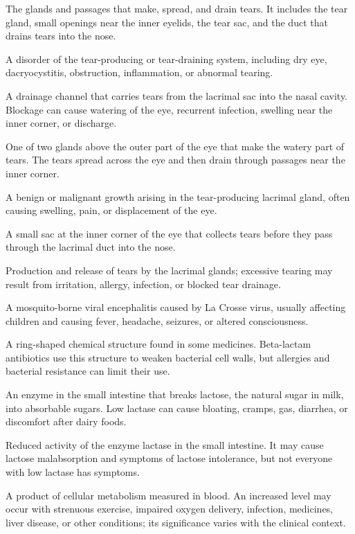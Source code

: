  The glands and passages that make, spread, and drain tears. It includes the tear gland, small openings near the inner eyelids, the tear sac, and the duct that drains tears into the nose.

 A disorder of the tear-producing or tear-draining system, including dry eye, dacryocystitis, obstruction, inflammation, or abnormal tearing.

 A drainage channel that carries tears from the lacrimal sac into the nasal cavity. Blockage can cause
watering of the eye, recurrent infection, swelling near the inner corner, or discharge.

 One of two glands above the outer part of the eye that make the watery part of tears. The tears spread across the eye and then drain through passages near the inner corner.

 A benign or malignant growth arising in the tear-producing lacrimal gland, often causing swelling, pain, or displacement of the eye.

 A small sac at the inner corner of the eye that collects tears before they pass through the lacrimal duct into the nose.

 Production and release of tears by the lacrimal glands; excessive tearing may result from irritation, allergy, infection, or blocked tear drainage.

 A mosquito-borne viral encephalitis caused by La Crosse virus, usually affecting children and causing fever, headache, seizures, or altered consciousness.

 A ring-shaped chemical structure found in some medicines. Beta-lactam antibiotics use this structure to weaken bacterial cell walls, but allergies and bacterial resistance can limit their use.

 An enzyme in the small intestine that breaks lactose, the natural sugar in milk, into absorbable sugars. Low lactase can cause bloating, cramps, gas, diarrhea, or discomfort after dairy foods.

 Reduced activity of the enzyme lactase in the small intestine. It may cause lactose malabsorption and symptoms of lactose intolerance, but not everyone with low lactase has symptoms.

 A product of cellular metabolism measured in blood. An increased level may occur with strenuous exercise, impaired oxygen delivery, infection, medicines, liver disease, or other conditions; its significance varies with the clinical context.

